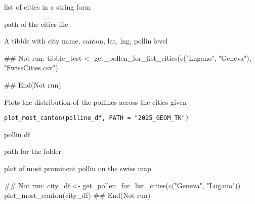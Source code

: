 \documentclass[letterpaper]{book}
\begin{document}
%
\begin{Arguments}
\begin{ldescription}
\item[\code{list\_cities}] list of cities in a string form

\item[\code{PATH}] path of the cities file
\end{ldescription}
\end{Arguments}
%
\begin{Value}
A tibble with city name, canton, lat, lng, pollin level
\end{Value}
%
\begin{Examples}
\begin{ExampleCode}
## Not run: 
tibble_test <- get_pollen_for_list_cities(c("Lugano", "Geneva"), "SwissCities.csv")

## End(Not run)

\end{ExampleCode}
\end{Examples}
%
\begin{Description}
Plots the distribution of the pollines across the cities given
\end{Description}
%
\begin{Usage}
\begin{verbatim}
plot_most_canton(polline_df, PATH = "2025_GEOM_TK")
\end{verbatim}
\end{Usage}
%
\begin{Arguments}
\begin{ldescription}
\item[\code{polline\_df}] pollin df

\item[\code{PATH}] path for the folder
\end{ldescription}
\end{Arguments}
%
\begin{Value}
plot of most prominent pollin on the swiss map
\end{Value}
%
\begin{Examples}
\begin{ExampleCode}
## Not run: 
city_df <- get_pollen_for_list_cities(c("Geneva", "Lugano"))
plot_most_canton(city_df)
## End(Not run)

\end{ExampleCode}
\end{Examples}
\end{document}
